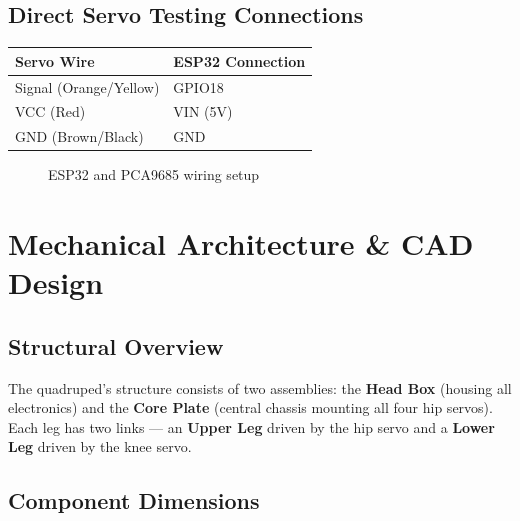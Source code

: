 \documentclass[12pt, a4paper]{article}
\begin{document}
\subsection{Direct Servo Testing Connections}

\begin{center}
\begin{tabular}{|l|l|}
\hline
\textbf{Servo Wire}      & \textbf{ESP32 Connection} \\
\hline
Signal (Orange/Yellow)  & GPIO18   \\
VCC (Red)               & VIN (5V) \\
GND (Brown/Black)       & GND      \\
\hline
\end{tabular}
\end{center}








\begin{figure}[H]
  \centering
  \vspace{10cm}
  \caption{ESP32 and PCA9685 wiring setup}
  \label{fig:wiring}
\end{figure}




\clearpage
\section{Mechanical Architecture \& CAD Design}\label{sec:mechanical}

\subsection{Structural Overview}

The quadruped's structure consists of two assemblies: the \textbf{Head Box}
(housing all electronics) and the \textbf{Core Plate} (central chassis mounting
all four hip servos). Each leg has two links --- an \textbf{Upper Leg} driven by
the hip servo and a \textbf{Lower Leg} driven by the knee servo.

\subsection{Component Dimensions}
\end{document}

